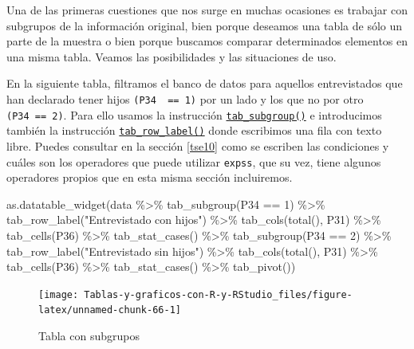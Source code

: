 \documentclass[
]{book}
\newenvironment{Shaded}{\begin{snugshade}}{\end{snugshade}}
\newcommand{\DecValTok}[1]{\textcolor[rgb]{0.00,0.00,0.81}{#1}}
\newcommand{\FunctionTok}[1]{\textcolor[rgb]{0.00,0.00,0.00}{#1}}
\newcommand{\NormalTok}[1]{#1}
\newcommand{\SpecialCharTok}[1]{\textcolor[rgb]{0.00,0.00,0.00}{#1}}
\newcommand{\StringTok}[1]{\textcolor[rgb]{0.31,0.60,0.02}{#1}}
\begin{document}
Una de las primeras cuestiones que nos surge en muchas ocasiones es trabajar con subgrupos de la información original, bien porque deseamos una tabla de sólo un parte de la muestra o bien porque buscamos comparar determinados elementos en una misma tabla. Veamos las posibilidades y las situaciones de uso.

En la siguiente tabla, filtramos el banco de datos para aquellos entrevistados que han declarado tener hijos \texttt{(P34\ \ ==\ 1)} por un lado y los que no por otro \texttt{(P34\ ==\ 2)}. Para ello usamos la instrucción \href{https://rdrr.io/cran/expss/man/tables.html}{\texttt{tab\_subgroup()}} e introducimos también la instrucción \href{https://rdrr.io/cran/expss/man/tables.html}{\texttt{tab\_row\_label()}} donde escribimos una fila con texto libre. Puedes consultar en la sección \ref{tse10} como se escriben las condiciones y cuáles son los operadores que puede utilizar \texttt{expss}, que su vez, tiene algunos operadores propios que en esta misma sección incluiremos.

\begin{Shaded}
\begin{Highlighting}[]
\FunctionTok{as.datatable\_widget}\NormalTok{(data }\SpecialCharTok{\%\textgreater{}\%}
  \FunctionTok{tab\_subgroup}\NormalTok{(P34 }\SpecialCharTok{==} \DecValTok{1}\NormalTok{) }\SpecialCharTok{\%\textgreater{}\%}
  \FunctionTok{tab\_row\_label}\NormalTok{(}\StringTok{"Entrevistado con hijos"}\NormalTok{) }\SpecialCharTok{\%\textgreater{}\%}
  \FunctionTok{tab\_cols}\NormalTok{(}\FunctionTok{total}\NormalTok{(), P31) }\SpecialCharTok{\%\textgreater{}\%}
  \FunctionTok{tab\_cells}\NormalTok{(P36) }\SpecialCharTok{\%\textgreater{}\%}
  \FunctionTok{tab\_stat\_cases}\NormalTok{() }\SpecialCharTok{\%\textgreater{}\%}
  \FunctionTok{tab\_subgroup}\NormalTok{(P34 }\SpecialCharTok{==} \DecValTok{2}\NormalTok{) }\SpecialCharTok{\%\textgreater{}\%}
  \FunctionTok{tab\_row\_label}\NormalTok{(}\StringTok{"Entrevistado sin hijos"}\NormalTok{) }\SpecialCharTok{\%\textgreater{}\%}
  \FunctionTok{tab\_cols}\NormalTok{(}\FunctionTok{total}\NormalTok{(), P31) }\SpecialCharTok{\%\textgreater{}\%}
  \FunctionTok{tab\_cells}\NormalTok{(P36) }\SpecialCharTok{\%\textgreater{}\%}
  \FunctionTok{tab\_stat\_cases}\NormalTok{() }\SpecialCharTok{\%\textgreater{}\%}
  \FunctionTok{tab\_pivot}\NormalTok{())}
\end{Highlighting}
\end{Shaded}

\begin{figure}[H]

{\centering \texttt{[image: Tablas-y-graficos-con-R-y-RStudio\_files/figure-latex/unnamed-chunk-66-1]} 

}

\caption{Tabla con subgrupos}\label{fig:unnamed-chunk-66}
\end{figure}
\end{document}
